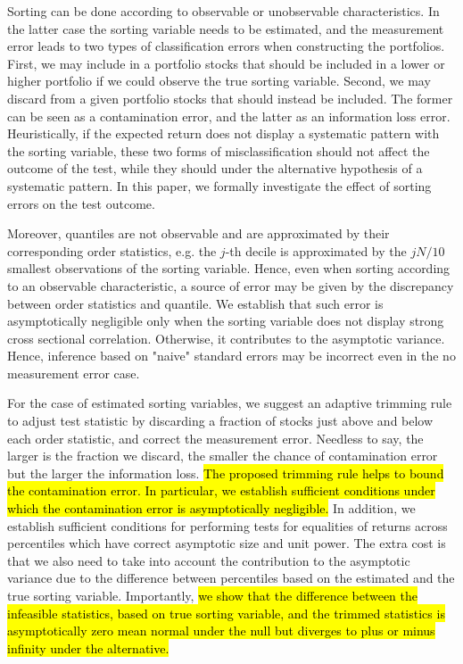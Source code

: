 Sorting can be done according to observable or unobservable characteristics. In the latter case the sorting variable needs to be estimated, and the measurement error leads to two types of classification errors when constructing the portfolios. First, we may include in a portfolio stocks that should be included in a lower or higher portfolio if we could observe the true sorting variable. Second, we may discard from a given portfolio stocks that should instead be included. The former can be seen as a contamination error, and the latter as an information loss error. Heuristically, if the expected return does not display a systematic pattern with the sorting variable, these two forms of misclassification should not affect the outcome of the test, while they should under the alternative hypothesis of a systematic pattern. In this paper, we formally investigate the effect of sorting errors on the test outcome. 

Moreover, quantiles are not observable and are approximated by their corresponding order statistics, e.g. the $j$-th decile is approximated by the $jN/10$ smallest observations of the sorting variable. Hence, even when sorting according to an observable characteristic, a source of error may be given by the discrepancy between order statistics and quantile. We establish that such error is asymptotically negligible only when the sorting variable does not display strong cross sectional correlation. Otherwise, it contributes to the asymptotic variance. Hence, inference based on "naive" standard errors may be incorrect even in the no measurement error case.

For the case of estimated sorting variables, we suggest an adaptive trimming rule to adjust test statistic by discarding a fraction of stocks just above and below each order statistic, and correct the measurement error. Needless to say, the larger is the fraction we discard, the smaller the chance of contamination error but the larger the information loss. \hl{The proposed trimming rule helps to bound the contamination error. In particular, we establish sufficient conditions under which the contamination error is asymptotically negligible.} In addition, we establish sufficient conditions for performing tests for equalities of returns across percentiles which have correct asymptotic size and unit power. The extra cost is that we also need to take into account the contribution to the asymptotic variance due to the difference between percentiles based on the estimated and the true sorting variable. Importantly, \hl{we show that the difference between the infeasible statistics, based on true sorting variable, and the trimmed statistics is asymptotically zero mean normal under the null but diverges to plus or minus infinity under the alternative.}

